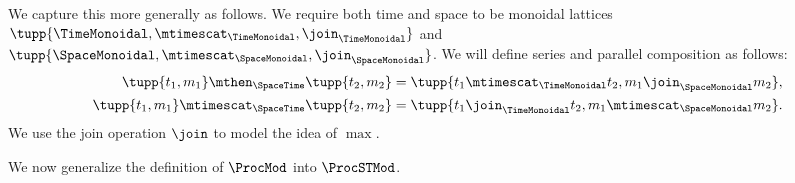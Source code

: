 We capture this more generally as follows. We require both time and space to be monoidal lattices $\tupp{\TimeMonoidal, \mtimescat_{\TimeMonoidal}, \join_{\TimeMonoidal}}$ and
$\tupp{\SpaceMonoidal, \mtimescat_{\SpaceMonoidal}, \join_{\SpaceMonoidal}}$.
%
We will define series and parallel composition as follows:
\begin{equation}
    \begin{aligned}
        \tupp{t_1,m_1} \mthen_{\SpaceTime}  \tupp{t_2,m_2} &= \tupp{t_1 \mtimescat_{\TimeMonoidal} t_2, m_1 \join_{\SpaceMonoidal} m_2}, \\
        \tupp{t_1,m_1} \mtimescat_{\SpaceTime}  \tupp{t_2,m_2} &= \tupp{t_1 \join_{\TimeMonoidal} t_2, m_1 \mtimescat_{\SpaceMonoidal} m_2}.
    \end{aligned}
\end{equation}
We use the join operation $\join$ to model the idea of $\max$.

We now generalize the definition of $\ProcMod$ into $\ProcSTMod$.



